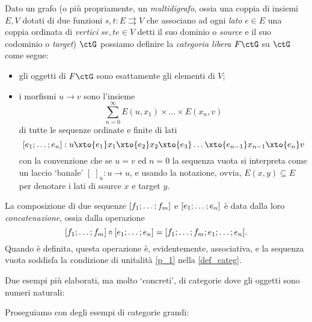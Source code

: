 \begin{example}
	Dato un grafo (o più propriamente, un \emph{multidigrafo}, ossia una coppia di insiemi \(E,V\) dotati di due funzioni \(s,t : E\rightrightarrows V\) che associano ad ogni \emph{lato} \(e\in E\) una coppia ordinata di \emph{vertici} \(se,te\in V\) detti il suo dominio o \emph{source} e il suo codominio o \emph{target}) \(\ctG\) possiamo definire la \emph{categoria libera} \(F\ctG\) su \(\ctG\) come segue:
	\begin{itemize}
		\item gli oggetti di \(F\ctG\) sono esattamente gli elementi di \(V\);
		\item i morfismi \(u\to v\) sono l'insieme
		      \[\sum_{n=0}^\infty E(u,x_1)\times\dots\times E(x_n,v)\]
		      di tutte le sequenze ordinate e finite di lati
		      \[ [\tup en;] : u \xto{e_1} x_1 \xto{e_2} x_2\xto{e_3} \dots\xto{e_{n-1}} x_{n-1}\xto{e_n} v\]
		      con la convenzione che se \(u=v\) ed \(n=0\) la sequenza vuota si interpreta come un laccio `banale' \([\;]_u : u\to u\), e usando la notazione, ovvia, \(E(x,y)\subseteq E\) per denotare i lati di source \(x\) e target \(y\).
	\end{itemize}
	La composizione di due sequenze \([\tup fm;]\) e \([\tup en;]\) è data dalla loro \emph{concatenazione}, ossia dalla operazione
	\[[\tup fm;]\circ[\tup en;] = [\tup fm;;\tup en;].\]
	Quando è definita, questa operazione è, evidentemente, associativa, e la sequenza vuota soddisfa la condizione di unitalità \ref{p_1} nella \autoref{def_categ}.
\end{example}
Due esempi più elaborati, ma molto `concreti', di categorie dove gli oggetti sono numeri naturali:
\begin{example}
\end{example}
\begin{example}
\end{example}
Proseguiamo con degli esempi di categorie grandi:
\begin{example}
\end{example}
\begin{example}
\end{example}
